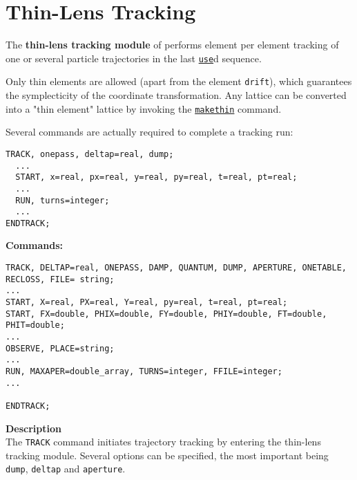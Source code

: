 
\chapter{Thin-Lens Tracking} %

The \textbf{thin-lens tracking module} of \madx performs element per
element tracking of one or several particle trajectories in the last
\href{../control/general.html#use}{\texttt{use}}d sequence.  
 

Only thin elements are allowed (apart from the element \texttt{drift}),
which guarantees the symplecticity of the coordinate transformation. Any
lattice can be converted into a "thin element" lattice by invoking the
\href{../makethin/makethin.html}{\texttt{makethin}} command. 

Several commands are actually required to complete a tracking run:

\begin{verbatim}
TRACK, onepass, deltap=real, dump; 
  ...
  START, x=real, px=real, y=real, py=real, t=real, pt=real;  
  ...
  RUN, turns=integer;
  ...
ENDTRACK;
\end{verbatim}

{\bf Commands:}
\begin{verbatim}
TRACK, DELTAP=real, ONEPASS, DAMP, QUANTUM, DUMP, APERTURE, ONETABLE, RECLOSS, FILE= string;
...
START, X=real, PX=real, Y=real, py=real, t=real, pt=real;
START, FX=double, PHIX=double, FY=double, PHIY=double, FT=double, PHIT=double;  
...
OBSERVE, PLACE=string;  
...
RUN, MAXAPER=double_array, TURNS=integer, FFILE=integer;  
...

ENDTRACK;
\end{verbatim}

{\bf Description}  \\
The \texttt{TRACK} command initiates trajectory tracking by entering the 
thin-lens tracking module. Several options can be specified, the most 
important being \texttt{dump}, \texttt{deltap} and
\texttt{aperture}. 
          
